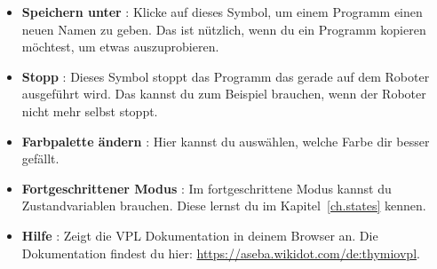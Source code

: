 \begin{itemize}
\item \textbf{Speichern unter} : Klicke auf dieses Symbol, um einem
    Programm einen neuen Namen zu geben. Das ist nützlich, wenn du ein Programm
    kopieren möchtest, um etwas auszuprobieren.
\item \textbf{Stopp} : Dieses Symbol stoppt das Programm das gerade
    auf dem Roboter ausgeführt wird. Das kannst du zum Beispiel brauchen, wenn
    der Roboter nicht mehr selbst stoppt.
\item \textbf{Farbpalette ändern} : Hier kannst du auswählen,
    welche Farbe dir besser gefällt.
\item \textbf{Fortgeschrittener Modus} : Im fortgeschrittene
    Modus kannst du Zustandvariablen brauchen. Diese lernst du im
    Kapitel~\ref{ch.states} kennen.
\item \textbf{Hilfe} : Zeigt die VPL Dokumentation in deinem Browser
    an. Die Dokumentation findest du hier: 
    \url{https://aseba.wikidot.com/de:thymiovpl}.
\end{itemize}
